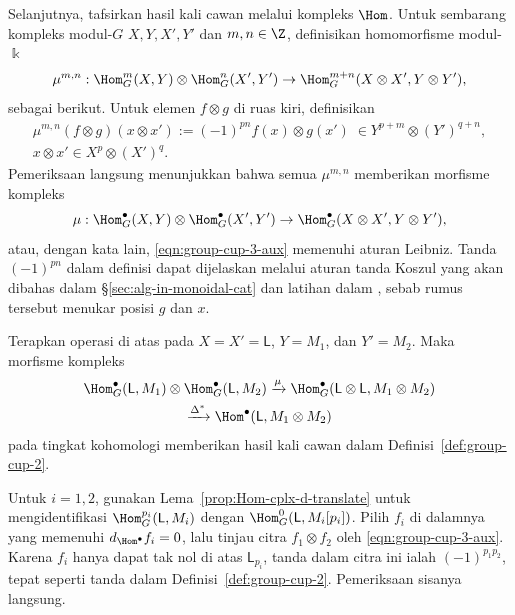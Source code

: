 Selanjutnya, tafsirkan hasil kali cawan melalui kompleks $\Hom$. Untuk sembarang
kompleks modul-$G$ $X,Y,X',Y'$ dan $m,n\in\Z$, definisikan homomorfisme
modul-$\Bbbk$
\begin{equation}\label{eqn:group-cup-3-aux}
	\mu^{m, n}: \Hom_G^m(X, Y) \otimes \Hom_G^n(X', Y') \to \Hom_G^{m+n}(X \otimes X', Y \otimes Y'),
\end{equation}
sebagai berikut. Untuk elemen $f\otimes g$ di ruas kiri, definisikan
\begin{gather*}
	\mu^{m, n}(f \otimes g)(x \otimes x') := (-1)^{pn} f(x) \otimes g(x') \; \in Y^{p+m} \otimes (Y')^{q+n}, \\
	x \otimes x' \in X^p \otimes (X')^q .
\end{gather*}
Pemeriksaan langsung menunjukkan bahwa semua $\mu^{m,n}$ memberikan morfisme
kompleks
\[ \mu: \Hom_G^\bullet(X, Y) \otimes \Hom_G^\bullet(X', Y') \to \Hom_G^\bullet(X \otimes X', Y \otimes Y'), \]
atau, dengan kata lain, \eqref{eqn:group-cup-3-aux} memenuhi aturan Leibniz.
Tanda $(-1)^{pn}$ dalam definisi dapat dijelaskan melalui aturan tanda Koszul
yang akan dibahas dalam \S\ref{sec:alg-in-monoidal-cat} dan latihan dalam
, sebab rumus tersebut menukar posisi $g$ dan $x$.

\begin{lema}\label{prop:std-cplx-cup-aux}
	Terapkan operasi di atas pada $X=X'=\mathsf{L}$, $Y=M_1$, dan $Y'=M_2$.
	Maka morfisme kompleks
	\begin{multline}\label{eqn:group-cup-3-aux1}
		\Hom^\bullet_G(\mathsf{L}, M_1) \otimes \Hom^\bullet_G(\mathsf{L}, M_2) \xrightarrow{\mu} \Hom^\bullet_G(\mathsf{L} \otimes \mathsf{L}, M_1 \otimes M_2) \\
		\xrightarrow{\Delta^*} \Hom^\bullet(\mathsf{L}, M_1 \otimes M_2)
	\end{multline}
	pada tingkat kohomologi memberikan hasil kali cawan dalam
	Definisi~\ref{def:group-cup-2}.
\end{lema}

\begin{bukti}
	Untuk $i=1,2$, gunakan Lema~\ref{prop:Hom-cplx-d-translate} untuk
	mengidentifikasi $\Hom_G^{p_i}(\mathsf{L},M_i)$ dengan
	$\Hom_G^0(\mathsf{L},M_i[p_i])$. Pilih $f_i$ di dalamnya yang memenuhi
	$d_{\Hom^\bullet}f_i=0$, lalu tinjau citra $f_1\otimes f_2$ oleh
\eqref{eqn:group-cup-3-aux}. Karena $f_i$ hanya dapat tak nol di atas
$\mathsf{L}_{p_i}$, tanda dalam citra ini ialah $(-1)^{p_1p_2}$, tepat seperti
tanda dalam Definisi~\ref{def:group-cup-2}. Pemeriksaan sisanya langsung.
\end{bukti}

